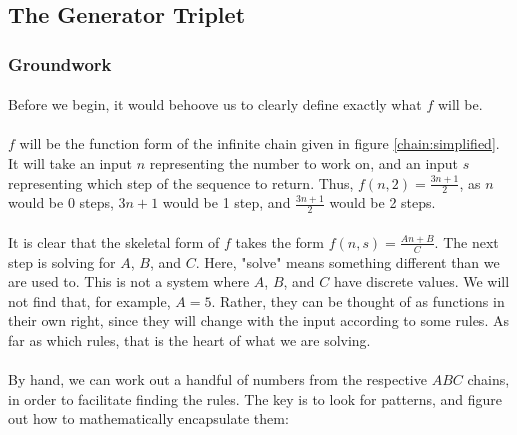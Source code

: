 \documentclass[12pt,letterpaper]{article}
\begin{document}
	\subsection{The Generator Triplet}
	
		\subsubsection{Groundwork}
		
			\paragraph{} Before we begin, it would behoove us to clearly define exactly what $f$ will be.
			
			\paragraph{} $f$ will be the function form of the infinite chain given in figure \ref{chain:simplified}. It will take an input $n$ representing the number to work on, and an input $s$ representing which step of the sequence to return. Thus, $f(n, 2) = \frac{3n+1}{2}$, as $n$ would be 0 steps, $3n+1$ would be 1 step, and $\frac{3n+1}{2}$ would be 2 steps.
			
			\paragraph{} It is clear that the skeletal form of $f$ takes the form $f(n, s) = \frac{An + B}{C}$. The next step is solving for $A$, $B$, and $C$. Here, "solve" means something different than we are used to. This is not a system where $A$, $B$, and $C$ have discrete values. We will not find that, for example, $A = 5$. Rather, they can be thought of as functions in their own right, since they will change with the input according to some rules. As far as which rules, that is the heart of what we are solving.
			
			\paragraph{} By hand, we can work out a handful of numbers from the respective $ABC$ chains, in order to facilitate finding the rules. The key is to look for patterns, and figure out how to mathematically encapsulate them:
			
\end{document}
